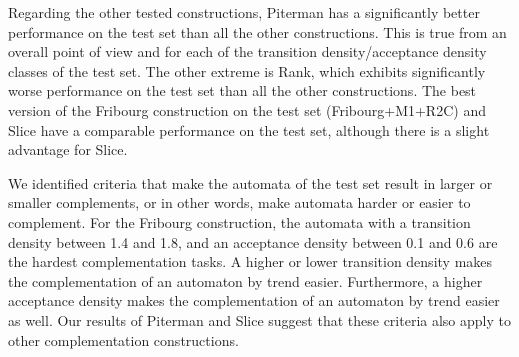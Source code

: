 Regarding the other tested constructions, Piterman has a significantly better performance on the \goal{} test set than all the other constructions. This is true from an overall point of view and for each of the transition density/acceptance density classes of the \goal{} test set. The other extreme is Rank, which exhibits significantly worse performance on the \goal{} test set than all the other constructions. The best version of the Fribourg construction on the \goal{} test set (Fribourg+M1+R2C) and Slice have a comparable performance on the \goal{} test set, although there is a slight advantage for Slice.

We identified criteria that make the automata of the \goal{} test set result in larger or smaller complements, or in other words, make automata harder or easier to complement. For the Fribourg construction, the automata with a transition density between 1.4 and 1.8, and an acceptance density between 0.1 and 0.6 are the hardest complementation tasks. A higher or lower transition density makes the complementation of an automaton by trend easier. Furthermore, a higher acceptance density makes the complementation of an automaton by trend easier as well. Our results of Piterman and Slice suggest that these criteria also apply to other complementation constructions.






